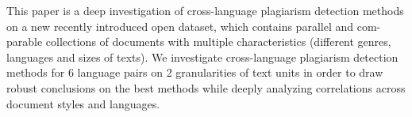 This paper is a deep investigation of cross-language plagiarism detection methods on a new recently introduced open dataset, which contains parallel and com- parable collections of documents with multiple characteristics (different genres, languages and sizes of texts). We investigate cross-language plagiarism detection methods for 6 language pairs on 2 granularities of text units in order to draw robust conclusions on the best methods while deeply analyzing correlations across document styles and languages.
